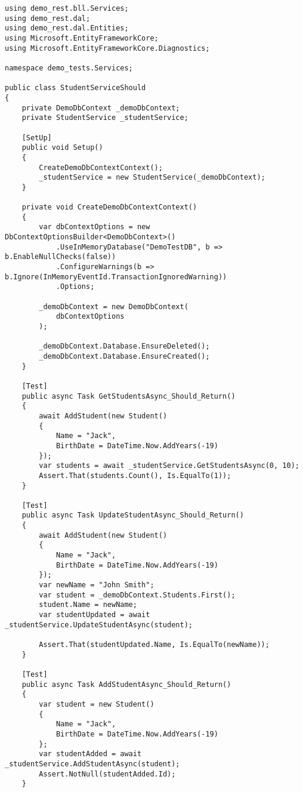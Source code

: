 \begin{lstlisting}
using demo_rest.bll.Services;
using demo_rest.dal;
using demo_rest.dal.Entities;
using Microsoft.EntityFrameworkCore;
using Microsoft.EntityFrameworkCore.Diagnostics;

namespace demo_tests.Services;

public class StudentServiceShould
{
    private DemoDbContext _demoDbContext;
    private StudentService _studentService;

    [SetUp]
    public void Setup()
    {
        CreateDemoDbContextContext();
        _studentService = new StudentService(_demoDbContext);
    }

    private void CreateDemoDbContextContext()
    {
        var dbContextOptions = new DbContextOptionsBuilder<DemoDbContext>()
            .UseInMemoryDatabase("DemoTestDB", b => b.EnableNullChecks(false))
            .ConfigureWarnings(b => b.Ignore(InMemoryEventId.TransactionIgnoredWarning))
            .Options;

        _demoDbContext = new DemoDbContext(
            dbContextOptions
        );

        _demoDbContext.Database.EnsureDeleted();
        _demoDbContext.Database.EnsureCreated();
    }

    [Test]
    public async Task GetStudentsAsync_Should_Return()
    {
        await AddStudent(new Student()
        {
            Name = "Jack",
            BirthDate = DateTime.Now.AddYears(-19)
        });
        var students = await _studentService.GetStudentsAsync(0, 10);
        Assert.That(students.Count(), Is.EqualTo(1));
    }

    [Test]
    public async Task UpdateStudentAsync_Should_Return()
    {
        await AddStudent(new Student()
        {
            Name = "Jack",
            BirthDate = DateTime.Now.AddYears(-19)
        });
        var newName = "John Smith";
        var student = _demoDbContext.Students.First();
        student.Name = newName;
        var studentUpdated = await _studentService.UpdateStudentAsync(student);

        Assert.That(studentUpdated.Name, Is.EqualTo(newName));
    }

    [Test]
    public async Task AddStudentAsync_Should_Return()
    {
        var student = new Student()
        {
            Name = "Jack",
            BirthDate = DateTime.Now.AddYears(-19)
        };
        var studentAdded = await _studentService.AddStudentAsync(student);
        Assert.NotNull(studentAdded.Id);
    }


\end{lstlisting}
